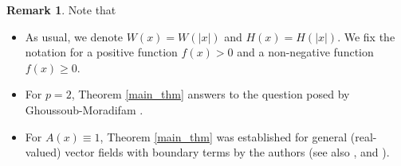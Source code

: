 \documentclass[a4paper,12pt,reqno]{amsart}
\theoremstyle{theorem}
\numberwithin{equation}{section}
\theoremstyle{plain}
\theoremstyle{definition}
\newtheorem{rem}[thm]{Remark}
\theoremstyle{defi}
\begin{document}
\begin{rem}	
	Note that
	\begin{itemize}
		\item As usual, we denote $W(x)=W(|x|)$ and $H(x)=H(|x|)$. We fix the notation for a positive function $f(x) > 0$ and a non-negative function $f(x)\geq 0$.
		\item For $p=2$, Theorem \ref{main_thm} answers to the question posed by Ghoussoub-Moradifam \cite{GM_book}.
		\item For $A(x)\equiv 1$, Theorem \ref{main_thm} was established for general (real-valued) vector fields with boundary terms by the authors \cite{RSS_NoDEA} (see also \cite{RS_book}, \cite{RV19} and \cite{Sabitbek_thesis}). 
	\end{itemize}
\end{rem}
\end{document}
